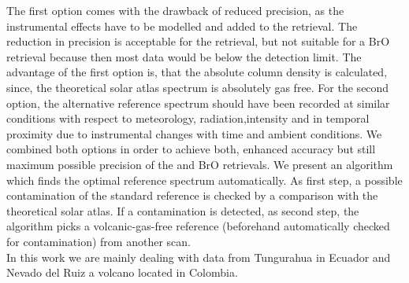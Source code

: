 The first option comes with the drawback of reduced precision, as the
instrumental effects have to be modelled and added to the retrieval. The reduction in precision is acceptable for the  retrieval, but not suitable for a BrO retrieval because then most data would be below the detection limit. The advantage of the first option is, that the absolute column density is calculated, since, the theoretical solar atlas spectrum is absolutely gas free. For the second option, the alternative reference spectrum should
have been recorded at similar conditions with respect to meteorology,
radiation,intensity and in temporal proximity due to instrumental changes
with time and ambient conditions. We combined both options in order to
achieve both, enhanced accuracy but still maximum possible precision of
the  and BrO retrievals. We present an algorithm which finds the
optimal reference spectrum automatically. As first step, a possible 
contamination of the standard reference is checked by a comparison with
the theoretical solar atlas. If a contamination is detected, as second step,
the algorithm picks a volcanic-gas-free reference (beforehand
automatically checked for contamination) from another scan.\\
%
\newline
%
In this work we are mainly dealing with data from Tungurahua in Ecuador and Nevado del Ruiz a volcano located in Colombia.